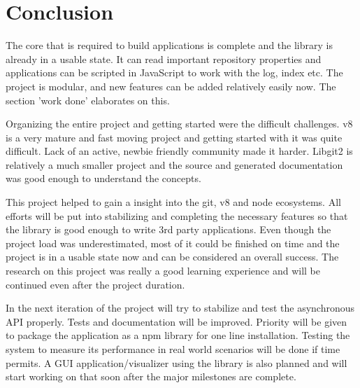 \chapter{Conclusion}

The core that is required to build applications is complete and the library is
already in a usable state. It can read important repository properties and
applications can be scripted in JavaScript to work with the log, index etc. The
project is modular, and new features can be added relatively easily now. The
section 'work done' elaborates on this.

Organizing the entire project and getting started were the difficult challenges.
v8 is a very mature and fast moving project and getting started with it was
quite difficult. Lack of an active, newbie friendly community made it harder.
Libgit2 is relatively a much smaller project and the source and generated
documentation was good enough to understand the concepts.

This project helped to gain a insight into the git, v8 and node ecosystems. All
efforts will be put into stabilizing and completing the necessary features so
that the library is good enough to write 3rd party applications. Even though the
project load was underestimated, most of it could be finished on time and the
project is in a usable state now and can be considered an overall success. The
research on this project was really a good learning experience and will be
continued even after the project duration.

In the next iteration of the project will try to stabilize and test the
asynchronous API properly. Tests and documentation will be improved. Priority
will be given to package the application as a npm library for one line
installation. Testing the system to measure its performance in real world
scenarios will be done if time permits. A GUI application/visualizer using the
library is also planned and will start working on that soon after the major
milestones are complete.
